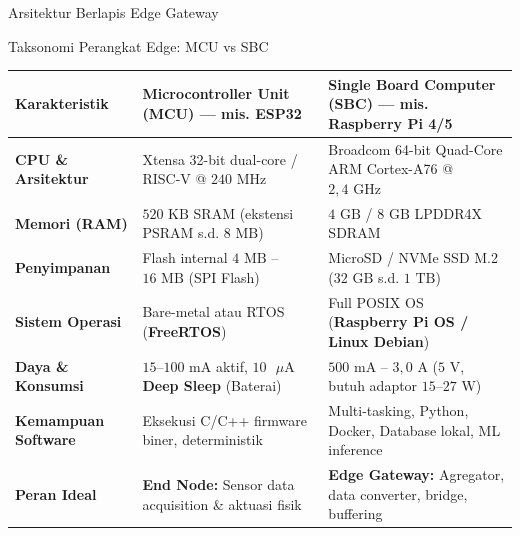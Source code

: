 \documentclass[aspectratio=169,10pt]{beamer}
\begin{document}
\begin{frame}{Arsitektur Berlapis Edge Gateway}
\end{frame}

\begin{frame}{Taksonomi Perangkat Edge: MCU vs SBC}
    \scriptsize
    \begin{tabularx}{\textwidth}{p{2.2cm} X X}
        \toprule
        \textbf{Karakteristik} & \textbf{Microcontroller Unit (MCU) --- mis. ESP32} & \textbf{Single Board Computer (SBC) --- mis. Raspberry Pi 4/5} \\
        \midrule
        \textbf{CPU \& Arsitektur} & Xtensa 32-bit dual-core / RISC-V @ $240\text{ MHz}$ & Broadcom 64-bit Quad-Core ARM Cortex-A76 @ $2{,}4\text{ GHz}$ \\
        \addlinespace
        \textbf{Memori (RAM)} & $520\text{ KB}$ SRAM (ekstensi PSRAM s.d. $8\text{ MB}$) & $4\text{ GB}$ / $8\text{ GB}$ LPDDR4X SDRAM \\
        \addlinespace
        \textbf{Penyimpanan} & Flash internal $4\text{ MB}$ -- $16\text{ MB}$ (SPI Flash) & MicroSD / NVMe SSD M.2 ($32\text{ GB}$ s.d. $1\text{ TB}$) \\
        \addlinespace
        \textbf{Sistem Operasi} & Bare-metal atau RTOS (\textbf{FreeRTOS}) & Full POSIX OS (\textbf{Raspberry Pi OS / Linux Debian}) \\
        \addlinespace
        \textbf{Daya \& Konsumsi} & $15\text{--}100\text{ mA}$ aktif, \textbf{$10\text{ }\mu\text{A}$ Deep Sleep} (Baterai) & $500\text{ mA}$ -- $3{,}0\text{ A}$ ($5\text{ V}$, butuh adaptor $15\text{--}27\text{ W}$) \\
        \addlinespace
        \textbf{Kemampuan Software} & Eksekusi C/C++ firmware biner, deterministik & Multi-tasking, Python, Docker, Database lokal, ML inference \\
        \addlinespace
        \textbf{Peran Ideal} & \textbf{End Node:} Sensor data acquisition \& aktuasi fisik & \textbf{Edge Gateway:} Agregator, data converter, bridge, buffering \\
        \bottomrule
    \end{tabularx}
\end{frame}
\end{document}
